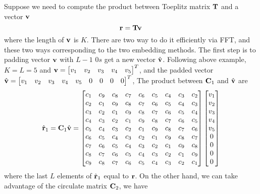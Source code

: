\documentclass[revised,endfloat]{geophysics}
\begin{document}
Suppose we need to compute the product between Toeplitz matrix ${\bf T}$ and a vector ${\bf v}$
\begin{equation}
{\bf r} = {\bf T}{\bf v} \,
\end{equation} 
where the length of ${\bf v}$ is $K$.
There are two way to do it efficiently via FFT, and these two ways corresponding to the two embedding methods. The first step is to padding vector ${\bf v}$ with $L-1$ $0s$ get a new vector $\hat{\bf v}$. Following above example, $K=L=5$ and ${\bf v} = \begin{bmatrix} v_1 & v_2 & v_3 & v_4 & v_5  \end{bmatrix}^T$, and the padded vector $\hat{\bf v} = \begin{bmatrix} v_1 & v_2 & v_3 & v_4 & v_5 & 0 & 0 & 0 & 0 \end{bmatrix}^T$, The product between ${\bf C}_1$ and $\hat{\bf v}$ are
\begin{equation}
\hat{\bf r}_1 = {\bf C}_1 \hat{\bf v} = \begin{bmatrix}
c_1 & c_9 & c_8 & c_7 & c_6 & c_5 &  c_4 & c_3 & c_2 \\ 
c_2 & c_1 & c_9 & c_8 & c_7 & c_6 &  c_5 & c_4 & c_3 \\ 
c_3 & c_2 & c_1 & c_9 & c_8 & c_7 &  c_6 & c_5 & c_4 \\ 
c_4 & c_3 & c_2 & c_1 & c_9 & c_8 &  c_7 & c_6 & c_5 \\ 
c_5 & c_4 & c_3 & c_2 & c_1 & c_9 &  c_8 & c_7 & c_6 \\ 
c_6 & c_5 & c_4 & c_3 & c_2 & c_1 &  c_9 & c_8 & c_7 \\ 
c_7 & c_6 & c_5 & c_4 & c_3 & c_2 &  c_1 & c_9 & c_8 \\ 
c_8 & c_7 & c_6 & c_5 & c_4 & c_3 &  c_2 & c_1 & c_9 \\ 
c_9 & c_8 & c_7 & c_6 & c_5 & c_4 &  c_3 & c_2 & c_1 \\ 
\end{bmatrix}
\begin{bmatrix}
v_1 \\
v_2 \\
v_3 \\
v_4 \\
v_5 \\
0 \\
0 \\
0 \\
0 \\
\end{bmatrix}
\end{equation}
where the last $L$ elements of $\hat{\bf r}_1$ equal to ${\bf r}$. On the other hand, we can take advantage of the circulate matrix ${\bf C}_2$, we have
\end{document}
